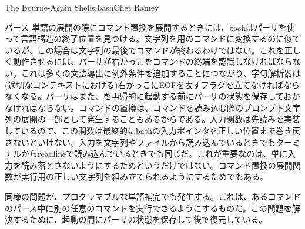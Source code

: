 \begin{aosachapter}{The Bourne-Again Shell}{s:bash}{Chet Ramey}
\begin{aosasect1}{パース}
単語の展開の際にコマンド置換を展開するときには、bashはパーサを使って言語構造の終了位置を見つける。文字列を用のコマンドに変換するのに似ているが、この場合は文字列の最後でコマンドが終わるわけではない。これを正しく動作させるには、パーサが右かっこをコマンドの終端を認識しなければならない。これは多くの文法導出に例外条件を追加することにつながり、字句解析器は(適切なコンテキストにおける)右かっこにEOFを表すフラグを立てなければならなくなる。パーサはまた、を再帰的に起動する前にパーサの状態を保存しておかなければならない。コマンドの置換は、コマンドを読み込む際のプロンプト文字列の展開の一部として発生することもあるからである。入力関数は先読みを実装しているので、この関数は最終的にbashの入力ポインタを正しい位置まで巻き戻さないといけない。入力を文字列やファイルから読み込んでいるときでもターミナルからreadlineで読み込んでいるときでも同じだ。これが重要なのは、単に入力を読み落とさないようにするためというだけではない。コマンド置換の展開関数が実行用の正しい文字列を組み立てられるようにするためでもある。

同様の問題が、プログラマブルな単語補完でも発生する。これは、あるコマンドのパース中に別の任意のコマンドを実行できるようにするものだ。この問題を解決するために、起動の間にパーサの状態を保存して後で復元している。


\end{aosasect1}
\end{aosachapter}
